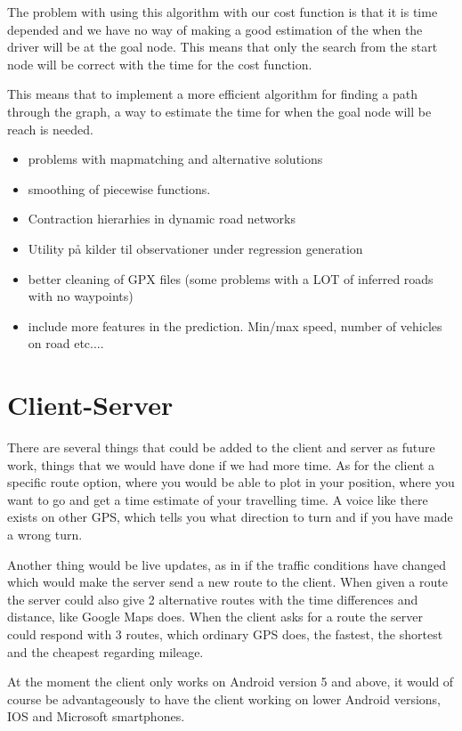 The problem with using this algorithm with our cost function is that it is time depended and we have no way of making a good estimation of the when the driver will be at the goal node. This means that only the search from the start node will be correct with the time for the cost function.

This means that to implement a more efficient algorithm for finding a path through the graph, a way to estimate the time for when the goal node will be reach is needed.


\begin{itemize}
	\item problems with mapmatching and alternative solutions
	\item smoothing of piecewise functions.
	\item Contraction hierarhies in dynamic road networks
	\item Utility på kilder til observationer under regression generation
	\item better cleaning of GPX files (some problems with a LOT of inferred roads with no waypoints)
	\item include more features in the prediction. Min/max speed, number of vehicles on road etc....
\end{itemize}

\section{Client-Server}
There are several things that could be added to the client and server as future work, things that we would have done if we had more time. 
As for the client a specific route option, where you would be able to plot in your position, where you want to go and get a time estimate of your travelling time. A voice like there exists on other GPS, which tells you what direction to turn and if you have made a wrong turn.

Another thing would be live updates, as in if the traffic conditions have changed which would make the server send a new route to the client. When given a route the server could also give 2 alternative routes with the time differences and distance, like Google Maps does. 
When the client asks for a route the server could respond with 3 routes, which ordinary GPS does, the fastest, the shortest and the cheapest regarding  mileage.

At the moment the client only works on Android version 5 and above, it would of course be advantageously to have the client working on lower Android versions, IOS and Microsoft smartphones.
